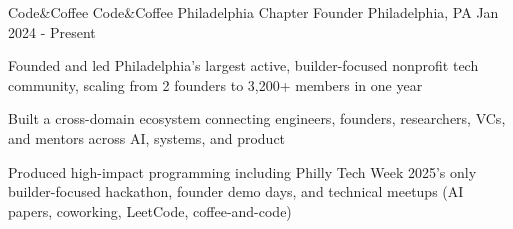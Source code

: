 \begin{cventries}
  \cventry
    {Code\&Coffee} %
    {Code\&Coffee Philadelphia Chapter Founder} %
    {Philadelphia, PA} %
    {Jan 2024 - Present} %
    {
    \begin{cvitems} %
      \item {Founded and led Philadelphia’s largest active, builder-focused nonprofit tech community, scaling from 2 founders to 3,200+ members in one year}
      \item {Built a cross-domain ecosystem connecting engineers, founders, researchers, VCs, and mentors across AI, systems, and product}
      \item {Produced high-impact programming including Philly Tech Week 2025's only builder-focused hackathon, founder demo days, and technical meetups (AI papers, coworking, LeetCode, coffee-and-code)}
    \end{cvitems}
    }
\end{cventries}
